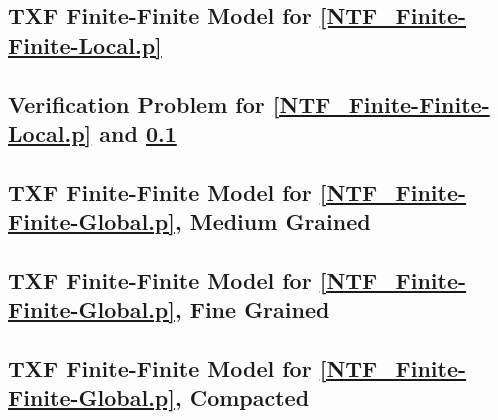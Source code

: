 \documentclass{easychair}
\begin{document}
\newpage
\subsection{TXF Finite-Finite Model for \ref{NTF_Finite-Finite-Local.p}}
\label{NTF_Finite-Finite-Local.s}
\begin{small}

\end{small}

\newpage
\subsection{Verification Problem for \ref{NTF_Finite-Finite-Local.p} and
\ref{NTF_Finite-Finite-Local.s}}
\label{NTF_Finite-Finite-Local.s.p}
\begin{small}

\end{small}

\newpage
\subsection{TXF Finite-Finite Model for \ref{NTF_Finite-Finite-Global.p}, Medium Grained}
\label{NTF_Finite-Finite-Global_Medium.s}
\begin{small}

\end{small}

\newpage
\subsection{TXF Finite-Finite Model for \ref{NTF_Finite-Finite-Global.p}, Fine Grained}
\label{NTF_Finite-Finite-Global_Fine.s}
\begin{small}

\end{small}

\newpage
\subsection{TXF Finite-Finite Model for \ref{NTF_Finite-Finite-Global.p}, Compacted}
\label{NTF_Finite-Finite-Global_Compact.s}
\begin{small}

\end{small}

\end{document}
